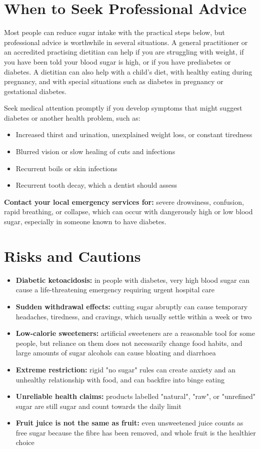 \section*{When to Seek Professional Advice}
Most people can reduce sugar intake with the practical steps below, but professional advice is worthwhile in several situations. A general practitioner or an accredited practising dietitian can help if you are struggling with weight, if you have been told your blood sugar is high, or if you have prediabetes or diabetes. A dietitian can also help with a child's diet, with healthy eating during pregnancy, and with special situations such as diabetes in pregnancy or gestational diabetes.

Seek medical attention promptly if you develop symptoms that might suggest diabetes or another health problem, such as:
\begin{itemize}
    \item Increased thirst and urination, unexplained weight loss, or constant tiredness
    \item Blurred vision or slow healing of cuts and infections
    \item Recurrent boils or skin infections
    \item Recurrent tooth decay, which a dentist should assess
\end{itemize}

\textbf{Contact your local emergency services for:} severe drowsiness, confusion, rapid breathing, or collapse, which can occur with dangerously high or low blood sugar, especially in someone known to have diabetes.

\section*{Risks and Cautions}
\begin{itemize}
    \item \textbf{Diabetic ketoacidosis:} in people with diabetes, very high blood sugar can cause a life-threatening emergency requiring urgent hospital care
    \item \textbf{Sudden withdrawal effects:} cutting sugar abruptly can cause temporary headaches, tiredness, and cravings, which usually settle within a week or two
    \item \textbf{Low-calorie sweeteners:} artificial sweeteners are a reasonable tool for some people, but reliance on them does not necessarily change food habits, and large amounts of sugar alcohols can cause bloating and diarrhoea
    \item \textbf{Extreme restriction:} rigid "no sugar" rules can create anxiety and an unhealthy relationship with food, and can backfire into binge eating
    \item \textbf{Unreliable health claims:} products labelled "natural", "raw", or "unrefined" sugar are still sugar and count towards the daily limit
    \item \textbf{Fruit juice is not the same as fruit:} even unsweetened juice counts as free sugar because the fibre has been removed, and whole fruit is the healthier choice
\end{itemize}

